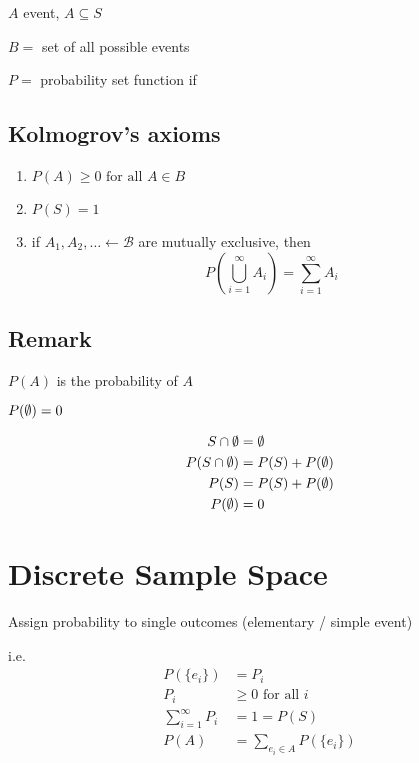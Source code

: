 $A$ event, $A \subseteq S$ 

$B = $ set of all possible events

$P  = $ probability set function if 


\subsection*{Kolmogrov's axioms}

\begin{enumerate}
    \item $P(A) \ge 0 \text{ for all } A \in B$ 
    \item $P(S) = 1$
    \item if $A_1, A_2, \ldots \leftarrow \mathcal{B}$ are mutually exclusive, then
	\[
	    P(\bigcup_{i = 1}^\infty A_i) = \sum\limits_{i=1}^{\infty} A_i
	\] 
\end{enumerate}

\subsection*{Remark}

$P(A)$ is the probability of $A$ 

\begin{rslt}
    $P(\emptyset) = 0$
\end{rslt}
\begin{prf}
\begin{align*}
    S \cap \emptyset &= \emptyset \\
    P(S \cap \emptyset) &= P(S) + P(\emptyset) \\
    P(S) &= P(S) + P(\emptyset) \\
    P(\emptyset) &= 0
\end{align*}
\end{prf}
\section*{Discrete Sample Space}

Assign probability to single outcomes (elementary / simple event)

i.e.
 \begin{align*}
     P( \{ e_i \} ) &= P_i \\
     P_i &\ge 0 \text{ for all } i \\
     \sum\limits_{i=1}^{\infty} P_i &= 1 = P(S) \\
     P(A) &= \sum\limits_{e_i \in A} P( \{ e_i \} )
\end{align*}

